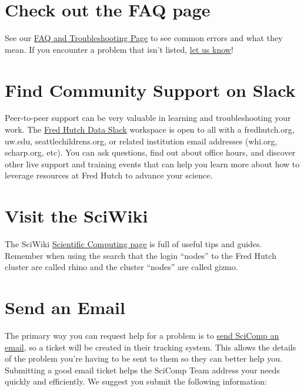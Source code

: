 \documentclass[
]{book}
\begin{document}
\hypertarget{check-out-the-faq-page}{%
\section*{Check out the FAQ page}\label{check-out-the-faq-page}}

See our \protect\hyperlink{faq-and-troubleshooting}{FAQ and Troubleshooting Page} to see common errors and what they mean. If you encounter a problem that isn't listed, \protect\hyperlink{feedback}{let us know}!

\hypertarget{find-community-support-on-slack}{%
\section*{Find Community Support on Slack}\label{find-community-support-on-slack}}

Peer-to-peer support can be very valuable in learning and troubleshooting your work. The \href{https://fhdata.slack.com}{Fred Hutch Data Slack} workspace is open to all with a fredhutch.org, uw.edu, seattlechildrens.org, or related institution email addresses (whi.org, scharp.org, etc). You can ask questions, find out about office hours, and discover other live support and training events that can help you learn more about how to leverage resources at Fred Hutch to advance your science.

\hypertarget{visit-the-sciwiki}{%
\section*{Visit the SciWiki}\label{visit-the-sciwiki}}

The SciWiki \href{https://sciwiki.fredhutch.org/scicomputing/comp_index/}{Scientific Computing page} is full of useful tips and guides. Remember when using the search that the login ``nodes'' to the Fred Hutch cluster are called rhino and the cluster ``nodes'' are called gizmo.

\hypertarget{send-an-email}{%
\section*{Send an Email}\label{send-an-email}}

The primary way you can request help for a problem is to \href{mailto:scicomp@fredhutch.org}{send SciComp an email}, so a ticket will be created in their tracking system. This allows the details of the problem you're having to be sent to them so they can better help you. Submitting a good email ticket helps the SciComp Team address your needs quickly and efficiently. We suggest you submit the following information:
\end{document}
